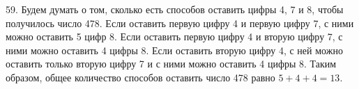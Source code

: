 59. Будем думать о том, сколько есть способов оставить цифры 4, 7 и 8, чтобы получилось число 478. Если оставить первую цифру 4 и первую цифру 7, с ними можно оставить 5 цифр 8. Если оставить первую цифру 4 и вторую цифру 7, с ними можно оставить 4 цифры 8. Если оставить вторую цифру 4, с ней можно оставить только вторую цифру 7 и с ними можно оставить 4 цифры 8. Таким образом, общее количество способов оставить число 478 равно $5+4+4=13.$\\
